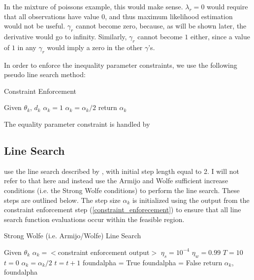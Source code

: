 \documentclass[letter,12pt]{article}
\begin{document}
In the mixture of poissons example, this would make sense.  $\lambda_r=0$ would require that all observations have value $0$, and thus maximum likelihood estimation would not be useful.  $\gamma_r$ cannot become zero, because, as will be shown later, the derivative would go to infinity.  Similarly, $\gamma_r$ cannot become $1$ either, since a value of $1$ in any $\gamma_r$ would imply a zero in the other $\gamma$'s.

In order to enforce the inequality parameter constraints, we use the following pseudo line search method:
 

\begin{algorithm}
\caption{Constraint Enforcement}
\label{alg:constraint_enforecement}
\begin{algorithmic}[1]
\State Given $\theta_k$, $d_k$
\State $\alpha_k = 1$
\State $\alpha_k = \alpha_k / 2$
\EndWhile
\State return $\alpha_k$
\end{algorithmic}
\end{algorithm}

The equality parameter constraint is handled by 

\subsection{Line Search}

\cite{jamshidianj97} use the line search described by \cite{jamshidianj93}, with initial step length equal to 2.  I will not refer to that here and instead use the Armijo and Wolfe sufficient increase conditions (i.e. the Strong Wolfe conditions) to perform the line search.  These steps are outlined below.  The step size $\alpha_k$ is initialized using the output from the constraint enforcement step (\ref{constraint_enforecement}) to ensure that all line search function evaluations occur within the feasible region.


\begin{algorithm} 
\caption{Strong Wolfe (i.e. Armijo/Wolfe) Line Search}
\label{alg:armijo_wolfe}
\begin{algorithmic}[1]
\State Given $\theta_k$
\State $\alpha_k = <$constraint enforcement output$>$
\State $\eta_s = 10^{-4}$
\State $\eta_w = 0.99$
\State $T = 10$
\State $t = 0$
\State $\alpha_k = \alpha_k / 2$
\State $t = t + 1$
\EndWhile
{}
\State	foundalpha = True
\Else
\State  foundalpha = False
\EndIf
\State return $\alpha_k$, foundalpha
\end{algorithmic}
\end{algorithm}
\end{document}
